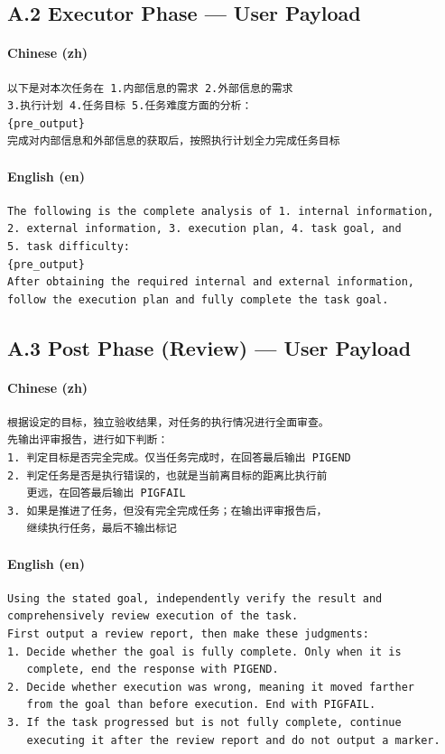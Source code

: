\subsection*{A.2 Executor Phase --- User Payload}

\paragraph*{Chinese (zh)}
\begin{lstlisting}[basicstyle=\ttfamily\scriptsize, frame=single]
以下是对本次任务在 1.内部信息的需求 2.外部信息的需求
3.执行计划 4.任务目标 5.任务难度方面的分析：
{pre_output}
完成对内部信息和外部信息的获取后，按照执行计划全力完成任务目标
\end{lstlisting}

\paragraph*{English (en)}
\begin{lstlisting}[basicstyle=\ttfamily\scriptsize, frame=single]
The following is the complete analysis of 1. internal information,
2. external information, 3. execution plan, 4. task goal, and
5. task difficulty:
{pre_output}
After obtaining the required internal and external information,
follow the execution plan and fully complete the task goal.
\end{lstlisting}

\subsection*{A.3 Post Phase (Review) --- User Payload}

\paragraph*{Chinese (zh)}
\begin{lstlisting}[basicstyle=\ttfamily\scriptsize, frame=single]
根据设定的目标，独立验收结果，对任务的执行情况进行全面审查。
先输出评审报告，进行如下判断：
1. 判定目标是否完全完成。仅当任务完成时，在回答最后输出 PIGEND
2. 判定任务是否是执行错误的，也就是当前离目标的距离比执行前
   更远，在回答最后输出 PIGFAIL
3. 如果是推进了任务，但没有完全完成任务；在输出评审报告后，
   继续执行任务，最后不输出标记
\end{lstlisting}

\paragraph*{English (en)}
\begin{lstlisting}[basicstyle=\ttfamily\scriptsize, frame=single]
Using the stated goal, independently verify the result and
comprehensively review execution of the task.
First output a review report, then make these judgments:
1. Decide whether the goal is fully complete. Only when it is
   complete, end the response with PIGEND.
2. Decide whether execution was wrong, meaning it moved farther
   from the goal than before execution. End with PIGFAIL.
3. If the task progressed but is not fully complete, continue
   executing it after the review report and do not output a marker.
\end{lstlisting}
